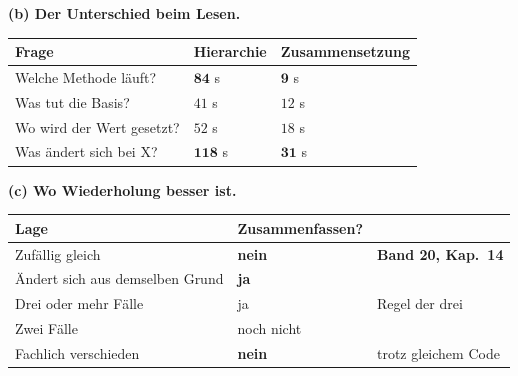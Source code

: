 \begin{aufgabe}
\begin{center}
\end{center}

\medskip
\textbf{(b) Der Unterschied beim Lesen.}

\begin{center}
{\small
\renewcommand{\arraystretch}{1.45}
\begin{tabular}{@{}P{3.4cm}P{2.0cm}P{2.2cm}@{}}
\toprule
\textbf{Frage} & \textbf{Hierarchie} & \textbf{Zusammen\-setzung}\\
\midrule
Welche Methode läuft? & $\mathbf{84}$ s & \textcolor{gruen}{$\mathbf{9}$ s}\\
Was tut die Basis? & $41$ s & $12$ s\\
Wo wird der Wert gesetzt? & $52$ s & $18$ s\\
Was ändert sich bei X? & $\mathbf{118}$ s & \textcolor{gruen}{$\mathbf{31}$ s}\\
\bottomrule
\end{tabular}}
\end{center}

\begin{center}
\begin{minipage}{0.88\textwidth}
\end{minipage}
\end{center}

\begin{center}
\end{center}

\medskip
\textbf{(c) Wo Wiederholung besser ist.}

\begin{center}
{\small
\renewcommand{\arraystretch}{1.5}
\begin{tabular}{@{}P{3.2cm}P{2.6cm}P{2.2cm}@{}}
\toprule
\textbf{Lage} & \textbf{Zusammen\-fassen?} & \\
\midrule
Zufällig gleich & \textcolor{akzent}{\textbf{nein}} & \textbf{Band 20, Kap.~14}\\
Ändert sich aus demselben Grund & \textcolor{gruen}{\textbf{ja}} & \\
Drei oder mehr Fälle & \textcolor{gruen}{ja} & \textcolor{gruen}{Regel der drei}\\
Zwei Fälle & \textcolor{akzent}{noch nicht} & \\
Fachlich verschieden & \textcolor{akzent}{\textbf{nein}} & \textcolor{akzent}{trotz gleichem Code}\\
\bottomrule
\end{tabular}}
\end{center}


\end{aufgabe}
